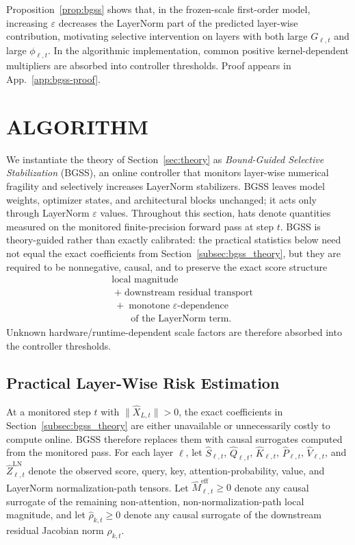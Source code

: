 \documentclass[twoside]{article}
\theoremstyle{definition}
\theoremstyle{remark}
\begin{document}
Proposition~\ref{prop:bgss} shows that, in the frozen-scale first-order model,
increasing $\varepsilon$ decreases the LayerNorm part of the predicted
layer-wise contribution, motivating selective intervention on layers with both
large $G_{\ell,t}$ and large $\phi_{\ell,t}$. In the algorithmic
implementation, common positive kernel-dependent multipliers are absorbed into
controller thresholds. Proof appears in App.~\ref{app:bgss-proof}.

\section{ALGORITHM}
\label{sec:algorithm}

We instantiate the theory of Section~\ref{sec:theory} as
\emph{Bound-Guided Selective Stabilization} (BGSS), an online controller that
monitors layer-wise numerical fragility and selectively increases LayerNorm
stabilizers. BGSS leaves model weights, optimizer states, and architectural
blocks unchanged; it acts only through LayerNorm $\varepsilon$ values.
Throughout this section, hats denote quantities measured on the monitored
finite-precision forward pass at step $t$. BGSS is theory-guided rather than
exactly calibrated: the practical statistics below need not equal the exact
coefficients from Section~\ref{subsec:bgss_theory}, but they are required to be
nonnegative, causal, and to preserve the exact score structure
\[
\begin{aligned}
&\text{local magnitude}
\\
&\;+\;\text{downstream residual transport}
\\
&\;+\;\text{monotone }\varepsilon\text{-dependence}
\\
&\qquad\text{of the LayerNorm term.}
\end{aligned}
\]
Unknown hardware/runtime-dependent scale factors are therefore absorbed into the
controller thresholds.

\subsection{Practical Layer-Wise Risk Estimation}
\label{subsec:bgss_estimation}

At a monitored step $t$ with $\|\widehat{X}_{L,t}\|>0$, the exact coefficients in
Section~\ref{subsec:bgss_theory} are either unavailable or unnecessarily costly
to compute online. BGSS therefore replaces them with causal surrogates computed
from the monitored pass. For each layer $\ell$, let $\widehat{S}_{\ell,t}$,
$\widehat{Q}_{\ell,t}$, $\widehat{K}_{\ell,t}$, $\widehat{P}_{\ell,t}$,
$\widehat{V}_{\ell,t}$, and $\widehat{Z}^{\mathrm{LN}}_{\ell,t}$ denote the
observed score, query, key, attention-probability, value, and LayerNorm
normalization-path tensors. Let
$\widehat{M}^{\mathrm{eff}}_{\ell,t}\ge 0$ denote any causal surrogate of the
remaining non-attention, non-normalization-path local magnitude, and let
$\widehat{\rho}_{k,t}\ge 0$ denote any causal surrogate of the downstream
residual Jacobian norm $\rho_{k,t}$.
\end{document}
